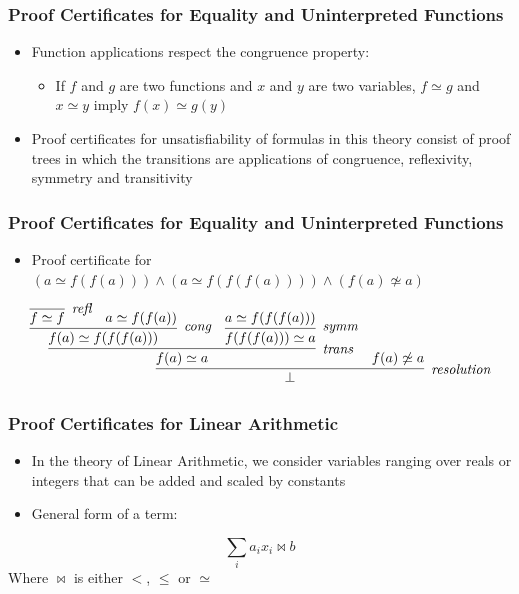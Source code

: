 \documentclass[usepdftitle=false,aspectratio=169,usenames,dvipsnames]{beamer}
\newcommand\vitem{\vfill\item}
\begin{document}
\begin{frame}
  \frametitle{Proof Certificates for Equality and Uninterpreted Functions}
  \begin{itemize}
    \item Function applications respect the congruence property:
    \begin{itemize}
      \item If $f$ and $g$ are two functions and $x$ and $y$ are two variables, $f \simeq g$ and $x \simeq y$ imply $f(x) \simeq g(y)$
    \end{itemize}
    \vitem Proof certificates for unsatisfiability of formulas in this theory consist of proof trees in which the transitions are applications of congruence, reflexivity, symmetry and transitivity
  \end{itemize}
\end{frame}

\begin{frame}
  \frametitle{Proof Certificates for Equality and Uninterpreted Functions}
  \begin{itemize}
    \item Proof certificate for $(a \simeq f(f(a))) \wedge (a \simeq f(f(f(a)))) \wedge (f(a) \not\simeq a)$
  \end{itemize}
  \vfill
  \[
    \infer[\textit{resolution}]{\bot}{\infer[\textit{trans}]{f(a) \simeq a}{\infer[\textit{cong}]{f(a) \simeq f(f(f(a)))}{\infer[\textit{refl}]{f \simeq f}{} & a \simeq f(f(a))} & \infer[\textit{symm}]{f(f(f(a))) \simeq a}{a \simeq f(f(f(a)))}} & f(a) \not\simeq a}
  \]
\end{frame}

\begin{frame}
  \frametitle{Proof Certificates for Linear Arithmetic}
  \begin{itemize}
    \item In the theory of Linear Arithmetic, we consider variables ranging over reals or integers that can be added and scaled by constants
    \vitem General form of a term:
  \end{itemize}
  \[
    \sum_{i} a_{i} x_{i} \bowtie b
  \]
  Where $\bowtie$ is either $<$, $\le$ or $\simeq$
\end{frame}
\end{document}
